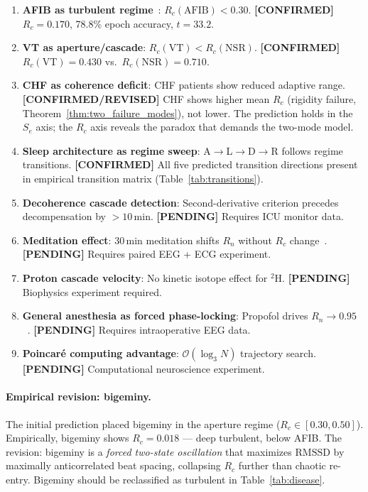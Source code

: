\documentclass[10pt,twocolumn,a4paper]{article}
\theoremstyle{definition}
\begin{document}
\begin{enumerate}
\item \textbf{AFIB as turbulent regime}~\cite{nattel2002atrial}: $R_c(\text{AFIB}) < 0.30$.
  \textbf{[CONFIRMED]} $R_c = 0.170$, 78.8\% epoch accuracy, $t = 33.2$.

\item \textbf{VT as aperture/cascade}: $R_c(\text{VT}) < R_c(\text{NSR})$.
  \textbf{[CONFIRMED]} $R_c(\text{VT}) = 0.430$ vs.\ $R_c(\text{NSR}) = 0.710$.

\item \textbf{CHF as coherence deficit}: CHF patients show reduced adaptive range.
  \textbf{[CONFIRMED/REVISED]} CHF shows higher mean $R_c$ (rigidity failure,
  Theorem~\ref{thm:two_failure_modes}), not lower. The prediction holds in the
  $S_e$ axis; the $R_c$ axis reveals the paradox that demands the two-mode model.

\item \textbf{Sleep architecture as regime sweep}: A$\to$L$\to$D$\to$R follows
  regime transitions. \textbf{[CONFIRMED]} All five predicted transition directions
  present in empirical transition matrix (Table~\ref{tab:transitions}).

\item \textbf{Decoherence cascade detection}: Second-derivative criterion precedes
  decompensation by $> 10$\,min. \textbf{[PENDING]} Requires ICU monitor data.

\item \textbf{Meditation effect}: 30\,min meditation shifts $R_n$ without $R_c$ change~\cite{tang2015neuroscience,phongsuphap2008heart}.
  \textbf{[PENDING]} Requires paired EEG + ECG experiment.

\item \textbf{Proton cascade velocity}: No kinetic isotope effect for $^2$H.
  \textbf{[PENDING]} Biophysics experiment required.

\item \textbf{General anesthesia as forced phase-locking}: Propofol drives
  $R_n \to 0.95$~\cite{alkire2008consciousness,mashour2005consciousness}. \textbf{[PENDING]} Requires intraoperative EEG data.

\item \textbf{Poincaré computing advantage}: $\mathcal{O}(\log_3 N)$ trajectory search.
  \textbf{[PENDING]} Computational neuroscience experiment.
\end{enumerate}

\paragraph{Empirical revision: bigeminy.}
The initial prediction placed bigeminy in the aperture regime ($R_c \in [0.30, 0.50]$).
Empirically, bigeminy shows $R_c = 0.018$ --- deep turbulent, below AFIB.
The revision: bigeminy is a \emph{forced two-state oscillation} that maximizes
$\mathrm{RMSSD}$ by maximally anticorrelated beat spacing, collapsing $R_c$
further than chaotic re-entry. Bigeminy should be reclassified as turbulent
in Table~\ref{tab:disease}.
\end{document}
